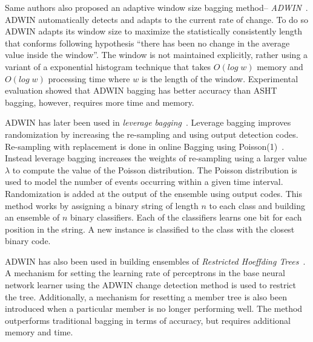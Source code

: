 Same authors also proposed an adaptive window size bagging method-- \textit{ADWIN}~\cite{bifet09:asht}. ADWIN automatically detects and adapts to the current rate of change. To do so ADWIN adapts its window size to maximize the statistically consistently length that conforms following hypothesis ``there has been no change in the average value inside the window''. The window is not maintained explicitly, rather using a variant of a exponential histogram technique that takes $O(log\;w)$ memory and $O(log\;w)$ processing time where $w$ is the length of the window. Experimental evaluation showed that ADWIN bagging has better accuracy than ASHT bagging, however, requires more time and memory. 

ADWIN has later been used in \textit{leverage bagging}~\cite{bifet10:levbag}. Leverage bagging improves randomization by increasing the re-sampling and using output detection codes. Re-sampling with replacement is done in online Bagging using Poisson(1)~\cite{oza01:obagboost}. Instead leverage bagging increases the weights of re-sampling using a larger value $\lambda$ to compute the value of the Poisson distribution. The Poisson distribution is used to model the number of events occurring within a given time interval. Randomization is added at the output of the ensemble using output codes. This method works by assigning a binary string of length $n$ to each class and building an ensemble of $n$ binary classifiers. Each of the classifiers learns one bit for each position in the string. A new instance is classified to the class with the closest binary code. 

ADWIN has also been used in building ensembles of \textit{Restricted Hoeffding Trees}~\cite{bifet10:rht}. A mechanism for setting the learning rate of perceptrons in the base neural network learner using the ADWIN change detection method is used to restrict the tree. Additionally, a mechanism for resetting a member tree is also been introduced when a particular member is no longer performing well. The method outperforms traditional bagging in terms of accuracy, but requires additional memory and time.

